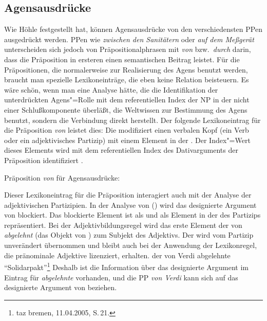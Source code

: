 {


\subsection{Agensausdrücke}
\label{sec-analyse-agensausdruecke}

Wie Höhle festgestellt hat, können Agensausdrücke von den verschiedensten PPen
ausgedrückt werden. PPen wie \emph{zwischen den Sanitätern} oder \emph{auf dem Meßgerät}
unterscheiden sich jedoch von Präpositionalphrasen mit \emph{von} bzw.\ \emph{durch} darin,
dass die Präposition in ersteren einen semantischen Beitrag leistet. Für die Präpositionen,
die normalerweise zur Realisierung des Agens benutzt werden, braucht man spezielle
Lexikoneinträge, die eben keine Relation beisteuern. Es wäre schön, wenn man eine Analyse hätte,
die die Identifikation der unterdrückten Agens"=Rolle mit dem referentiellen Index der NP in
der \vonpp nicht einer Schlußkomponente überläßt, die Weltwissen zur Bestimmung des Agens benutzt,
sondern die Verbindung direkt herstellt.
Der folgende Lexikoneintrag für die Präposition \emph{von} leistet dies:
Die \vonpp modifiziert einen verbalen Kopf (ein Verb oder ein adjektivisches Partizip) mit
einem Element in der \dalist. Der Index"=Wert dieses Elements wird mit dem referentiellen
Index des Dativarguments der Präposition identifiziert .

\eas
Präposition \emph{von} für Agensausdrücke:\\
\zs

\noindent
Dieser Lexikoneintrag für die Präposition interagiert auch mit der Analyse der adjektivischen Partizipien.
In der Analyse von () wird das designierte Argument von  blockiert. Das blockierte
Element ist als \subjw und als Element in der \dalist des Partizips repräsentiert. Bei der Adjektivbildungsregel
wird das erste Element der \compsl von \emph{abgelehnt} (das Objekt von ) zum Subjekt
des Adjektivs. Der \daw wird vom Partizip unverändert übernommen und bleibt auch bei der Anwendung
der Lexikonregel, die pränominale Adjektive lizenziert, erhalten.
\ea
der von Verdi abgelehnte "`Solidarpakt"'\footnote{
  taz bremen, 11.04.2005, S.\,21.%
}
\z
Deshalb ist die Information über das designierte Argument im Eintrag für \emph{abgelehnte} vorhanden,
und die PP \emph{von Verdi} kann sich auf das designierte Argument von  beziehen.

}
